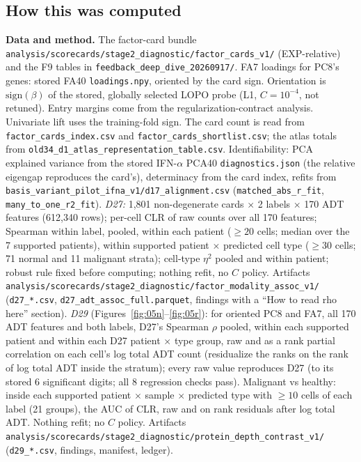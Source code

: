 \subsection*{How this was computed}
{\small\raggedright
\textbf{Data and method.} The factor-card bundle \texttt{analysis/\allowbreak scorecards/\allowbreak stage2\_diagnostic/\allowbreak factor\_cards\_v1/} (EXP-relative) and the F9 tables in \texttt{feedback\_deep\_dive\_20260917/}. FA7 loadings for PC8's genes: stored FA40 \texttt{loadings.npy}, oriented by the card sign. Orientation is $\mathrm{sign}(\beta)$ of the stored, globally selected LOPO probe (L1, $C=10^{-4}$, not retuned). Entry margins come from the regularization-contract analysis. Univariate lift uses the training-fold sign. The card count is read from \texttt{factor\_cards\_index.csv} and \texttt{factor\_cards\_shortlist.csv}; the atlas totals from \texttt{old34\_d1\_atlas\_representation\_table.csv}. Identifiability: PCA explained variance from the stored IFN-$\alpha$ PCA40 \texttt{diagnostics.json} (the relative eigengap reproduces the card's), determinacy from the card index, refits from \texttt{basis\_variant\_pilot\_ifna\_v1/\allowbreak d17\_alignment.csv} (\texttt{matched\_abs\_r\_fit}, \texttt{many\_to\_one\_r2\_fit}). \emph{D27:} 1,801 non-degenerate cards $\times$ 2 labels $\times$ 170 ADT features (612,340 rows); per-cell CLR of raw counts over all 170 features; Spearman within label, pooled, within each patient ($\geq 20$ cells; median over the 7 supported patients), within supported patient $\times$ predicted cell type ($\geq 30$ cells; 71 normal and 11 malignant strata); cell-type $\eta^2$ pooled and within patient; robust rule fixed before computing; nothing refit, no $C$ policy. Artifacts \texttt{analysis/\allowbreak scorecards/\allowbreak stage2\_diagnostic/\allowbreak factor\_modality\_assoc\_v1/} (\texttt{d27\_*.csv}, \texttt{d27\_adt\_assoc\_full.parquet}, findings with a ``How to read rho here'' section). \emph{D29} (Figures~\ref{fig:05n}--\ref{fig:05r}): for oriented PC8 and FA7, all 170 ADT features and both labels, D27's Spearman $\rho$ pooled, within each supported patient and within each D27 patient $\times$ type group, raw and as a rank partial correlation on each cell's log total ADT count (residualize the ranks on the rank of log total ADT inside the stratum); every raw value reproduces D27 (to its stored 6 significant digits; all 8 regression checks pass). Malignant vs healthy: inside each supported patient $\times$ sample $\times$ predicted type with $\geq 10$ cells of each label (21 groups), the AUC of CLR, raw and on rank residuals after log total ADT. Nothing refit; no $C$ policy. Artifacts \texttt{analysis/\allowbreak scorecards/\allowbreak stage2\_diagnostic/\allowbreak protein\_depth\_contrast\_v1/} (\texttt{d29\_*.csv}, findings, manifest, ledger).

}

